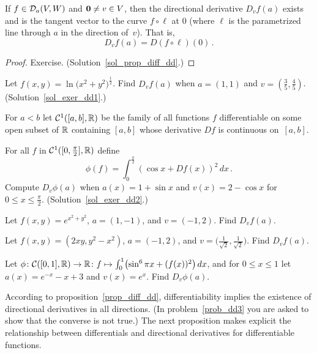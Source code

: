 \begin{prop}\label{prop_diff_dd}  If $f \in \mathcal{D}_a(V,W)$ and $\mathbf{0} \ne v \in V$, then the
directional derivative $D_vf(a)$ exists and is the tangent vector to the curve $f \circ \ell$
at $0$ (where $\ell$ is the parametrized line through $a$ in the direction of~$v$).  That is,
  \[ D_vf(a) = D(f \circ \ell)(0)\,. \]
\end{prop}

\begin{proof} Exercise.  (Solution~\ref{sol_prop_diff_dd}.)  \ns   \end{proof}

\begin{exer}\label{exer_dd1} Let $f(x,y) = \ln\bigl(x^2 + y^2\bigr)^{\frac12}$.  Find $D_vf(a)$
when $a=(1,1)$ and $v=(\frac35,\frac45)$.  (Solution~\ref{sol_exer_dd1}.)
\end{exer}

\begin{notn}  For $a < b$ let $\mathcal{C}^1([a,b],\mathbb{R})$ be the family of all functions $f$ differentiable
on some open subset of $\mathbb{R}$ containing $[a,b]$ whose derivative $Df$ is continuous on~$[a,b]$.
\end{notn}

\begin{exer}\label{exer_dd2}  For all $f$ in $\mathcal{C}^1([0,\frac{\pi}2],\mathbb{R})$ define
  \[ \phi(f) = \int_0^{\frac{\pi}2}(\cos x + Df(x))^2\,dx\,. \]
Compute $D_v\phi(a)$ when $a(x) = 1 + \sin x$ and $v(x) = 2 - \cos x$ for $0 \le x \le
\frac{\pi}2$.   (Solution~\ref{sol_exer_dd2}.)
\end{exer}

\begin{prob} Let $f(x,y) = e^{x^2 + y^2}$, $a = (1,-1)$, and $v = (-1,2)$.  Find $D_vf(a)$.
\end{prob}

\begin{prob} Let $f(x,y) = (2xy,y^2 - x^2)$, $a = (-1,2)$, and $v =
\bigl(\frac1{\sqrt2},\frac1{\sqrt2}\bigr)$.  Find $D_vf(a)$.
\end{prob}

\begin{prob} Let $\phi\colon \mathcal{C}([0,1],\mathbb{R}) \rightarrow \mathbb{R}\colon  f \mapsto
\int_0^1\bigl(\sin^6\pi x + (f(x))^2\bigr)\,dx$, and for $0 \le x \le 1$ let $a(x) = e^{-x} -
x + 3$ and $v(x) = e^x$.  Find $D_v\phi(a)$.
\end{prob}

According to proposition~\ref{prop_diff_dd}, differentiability implies the existence of
directional derivatives in all directions. (In problem~\ref{prob_dd3} you are asked to show
that the converse is not true.)  The next proposition makes explicit the relationship between
differentials and directional derivatives for differentiable functions.

